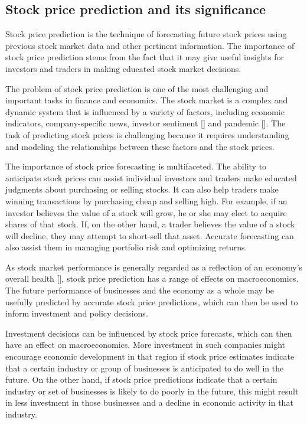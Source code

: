 \documentclass[a4paper]{article}
\begin{document}
\subsection{Stock price prediction and its significance}

Stock price prediction is the technique of forecasting future stock prices using previous stock market data and other pertinent information. The importance of stock price prediction stems from the fact that it may give useful insights for investors and traders in making educated stock market decisions.

The problem of stock price prediction is one of the most challenging and important tasks in finance and economics. The stock market is a complex and dynamic system that is influenced by a variety of factors, including economic indicators, company-specific news, investor sentiment [\cite{barsky1993does, mitchell1994impact,qi1999economic,hondroyiannis2001macroeconomic}] and pandemic [\cite{mazur2021covid,baker2020unprecedented}]. The task of predicting stock prices is challenging because it requires understanding and modeling the relationships between these factors and the stock prices.

The importance of stock price forecasting is multifaceted. The ability to anticipate stock prices can assist individual investors and traders make educated judgments about purchasing or selling stocks. It can also help traders make winning transactions by purchasing cheap and selling high. For example, if an investor believes the value of a stock will grow, he or she may elect to acquire shares of that stock. If, on the other hand, a trader believes the value of a stock will decline, they may attempt to short-sell that asset. Accurate forecasting can also assist them in managing portfolio risk and optimizing returns.

As stock market performance is generally regarded as a reflection of an economy's overall health [\cite{masoud2013impact}], stock price prediction has a range of effects on macroeconomics. The future performance of businesses and the economy as a whole may be usefully predicted by accurate stock price predictions, which can then be used to inform investment and policy decisions.

Investment decisions can be influenced by stock price forecasts, which can then have an effect on macroeconomics. More investment in such companies might encourage economic development in that region if stock price estimates indicate that a certain industry or group of businesses is anticipated to do well in the future. On the other hand, if stock price predictions indicate that a certain industry or set of businesses is likely to do poorly in the future, this might result in less investment in those businesses and a decline in economic activity in that industry.
\end{document}
